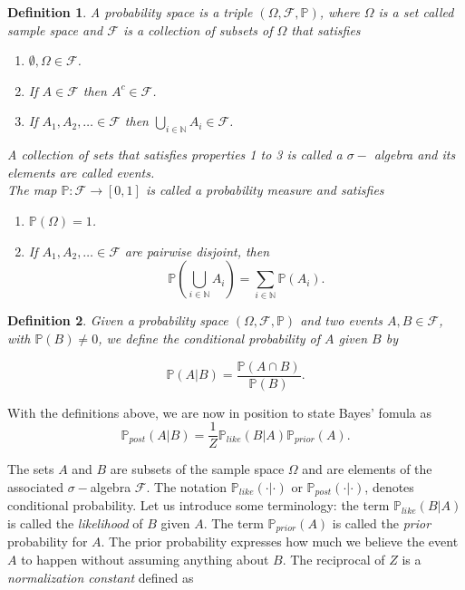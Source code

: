 \documentclass[12pt]{book}
\newtheorem{definition}{Definition}
\newcommand{\post}{\mathbb{P}_{post}}
\newcommand{\like}{\mathbb{P}_{like}}
\newcommand{\prior}{\mathbb{P}_{prior}}
\newcommand{\p}{\mathbb{P}}
\begin{document}
\begin{definition}\label{dfnprobabilitytriple}
A probability space is a triple $(\Omega,\mathscr{F},\p)$, where $\Omega$ is a set called 
sample space and $\mathscr{F}$ is a collection of subsets of $\Omega$ that satisfies
\begin{enumerate}
\item $\emptyset,\Omega\in\mathscr{F}$.
\item If $A\in\mathscr{F}$ then $A^{c}\in\mathscr{F}$.
\item If $A_{1},A_{2},\ldots \in\mathscr{F}$ then $\bigcup_{i\in\mathbb{N}}A_{i}\in\mathscr{F}$.
\end{enumerate}
A  collection of sets that satisfies properties 1 to 3 is called a $\sigma-$ algebra and its elements are called
events. 
\\
The map $\p:\mathscr{F}\rightarrow [0,1]$ is called a probability measure and satisfies
\begin{enumerate}
\item $\p(\Omega)=1$.
\item If $A_{1},A_{2},\ldots \in\mathscr{F}$ are pairwise disjoint, then 
\begin{equation*}
\p\left(\bigcup_{i\in\mathbb{N}}A_{i}\right)=\sum_{i\in\mathbb{N}}\p(A_{i}).
\end{equation*}
\end{enumerate}
\end{definition}

\begin{definition}
Given a probability space $(\Omega,\mathscr{F},\p)$ and two events $A,B\in\mathscr{F}$, with $\p(B)\neq 0$,
we define the conditional probability of $A$ given $B$ by

\begin{equation*}
\p(A|B)=\frac{\p(A\cap B)}{\p(B)}.
\end{equation*}
\end{definition}


With the definitions above, we are now in position to state Bayes' fomula as
\begin{equation}\label{eqnBayes}
\post(A|B)=\frac{1}{Z}\like(B|A)\prior(A).
\end{equation}


The sets $A$ and $B$ are subsets of the sample space $\Omega$ and 
are elements of the associated $\sigma-$algebra $\mathscr{F}$. The  notation
 $\like(\cdot|\cdot)$ or $\post(\cdot|\cdot)$, denotes conditional probability. Let us introduce some terminology:
 the term $\like(B|A)$ is called the \textit{likelihood} of $B$ given $A$. The term $\prior(A)$ is called the 
\textit{prior} probability for $A$. The prior probability expresses how much we believe the event $A$ 
to happen without assuming
anything about  $B$. The reciprocal of $Z$ is a \textit{normalization constant} defined as 
\end{document}
